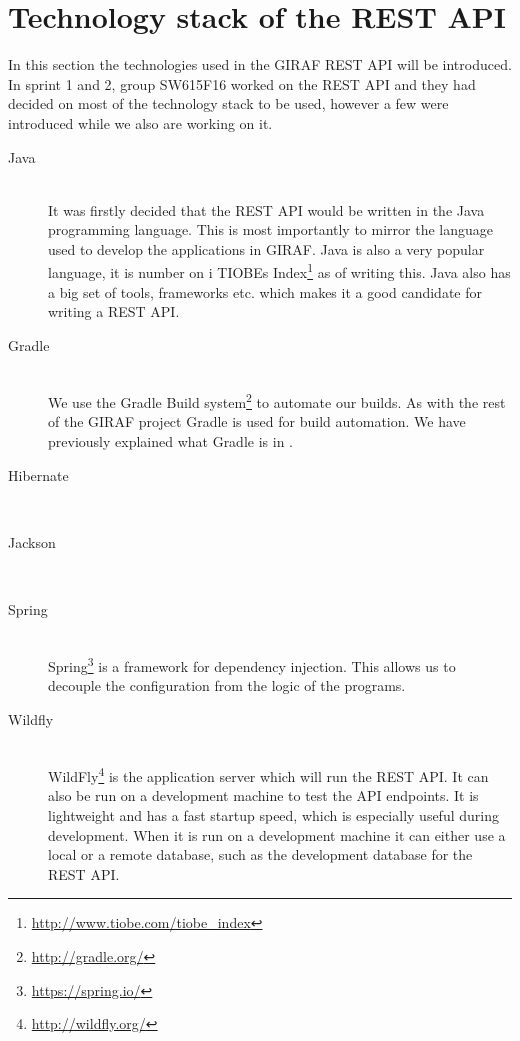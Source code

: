 

\section{Technology stack of the REST API}
In this section the technologies used in the GIRAF REST API will be introduced.
In sprint 1 and 2, group SW615F16 worked on the REST API and they had decided on most of the technology stack to be used, however a few were introduced while we also are working on it. 

\begin{description}
    \item[Java] \hfill \\
        It was firstly decided that the REST API would be written in the Java programming language.
        This is most importantly to mirror the language used to develop the applications in GIRAF.
        Java is also a very popular language, it is number on i TIOBEs Index\footnote{\url{http://www.tiobe.com/tiobe_index}} as of writing this. 
        Java also has a big set of tools, frameworks etc. which makes it a good candidate for writing a REST API.

    \item[Gradle] \hfill \\
        We use the Gradle Build system\footnote{\url{http://gradle.org/}} to automate our builds. 
        As with the rest of the GIRAF project Gradle is used for build automation. 
        We have previously explained what Gradle is in .

    \item[Hibernate] \hfill \\

    \item[Jackson] \hfill \\

    \item[Spring] \hfill \\ 
        Spring\footnote{\url{https://spring.io/}} is a framework for dependency injection. 
        This allows us to decouple the configuration from the logic of the programs. 

    \item[Wildfly] \hfill \\
        WildFly\footnote{\url{http://wildfly.org/}} is the application server which will run the REST API. 
        It can also be run on a development machine to test the API endpoints. 
        It is lightweight and has a fast startup speed, which is especially useful during development. 
        When it is run on a development machine it can either use a local or a remote database, such as the development database for the REST API. 


\end{description}
